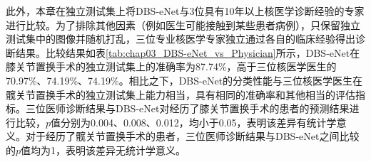 \begin{table}[htbp]
  \centering
  \caption{DBS-eNet在独立测试集上与三名专业核医学医生之间的比较}
  \label{tab:chap03_DBS-eNet_vs_Physician}
\end{table}

此外，本章在独立测试集上将DBS-eNet与3位具有10年以上核医学诊断经验的专家进行比较。为了排除其他因素（例如医生可能接触到某些患者病例），只保留独立测试集中的图像并随机打乱，三位专业核医学专家独立通过各自的临床经验得出诊断结果。比较结果如表\ref{tab:chap03_DBS-eNet_vs_Physician}所示，DBS-eNet在膝关节置换手术的独立测试集上的准确率为87.74\%，高于三位核医学医生的70.97\%、74.19\%、74.19\%。相比之下，DBS-eNet的分类性能与三位核医学医生在髋关节置换手术的独立测试集上能力相当，具有相同的准确率和其他相当的评估指标。三位医师诊断结果与DBS-eNet对经历了膝关节置换手术的患者的预测结果进行比较，\(p\)值分别为0.004、0.008、0.012，均小于0.05，表明该差异有统计学意义。对于经历了髋关节置换手术的患者，三位医师诊断结果与DBS-eNet之间比较的\(p\)值均为1，表明该差异无统计学意义。

